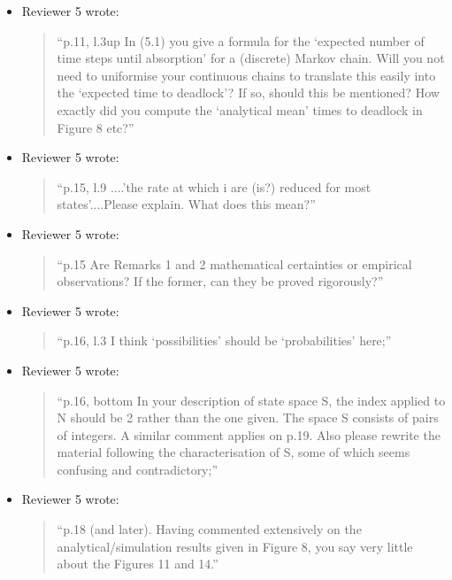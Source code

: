 \documentclass{article}
\begin{document}
\begin{itemize}
\item Reviewer 5 wrote:
\begin{quote}
``p.11, l.3up In (5.1) you give a formula for the ‘expected number of time steps until absorption’ for a (discrete) Markov chain. Will you not need to uniformise your continuous chains to translate this easily into the ‘expected time to deadlock’? If so, should this be mentioned? How exactly did you compute the ‘analytical mean’ times to deadlock in Figure 8 etc?''
\end{quote}

\item Reviewer 5 wrote:
\begin{quote}
``p.15, l.9 ....’the rate at which i are (is?) reduced for most states’....Please explain. What does this mean?''
\end{quote}

\item Reviewer 5 wrote:
\begin{quote}
``p.15 Are Remarks 1 and 2 mathematical certainties or empirical observations? If the former, can they be proved rigorously?''
\end{quote}

\item Reviewer 5 wrote:
\begin{quote}
``p.16, l.3 I think ‘possibilities’ should be ‘probabilities’ here;''
\end{quote}


\item Reviewer 5 wrote:
\begin{quote}
``p.16, bottom In your description of state space S, the index applied to N should be 2 rather than the one given. The space S consists of pairs of integers. A similar comment applies on p.19. Also please rewrite the material following the characterisation of S, some of which seems confusing and contradictory;''
\end{quote}


\item Reviewer 5 wrote:
\begin{quote}
``p.18 (and later). Having commented extensively on the analytical/simulation results given in Figure 8, you say very little about the Figures 11 and 14.''
\end{quote}


\end{itemize}
\end{document}
